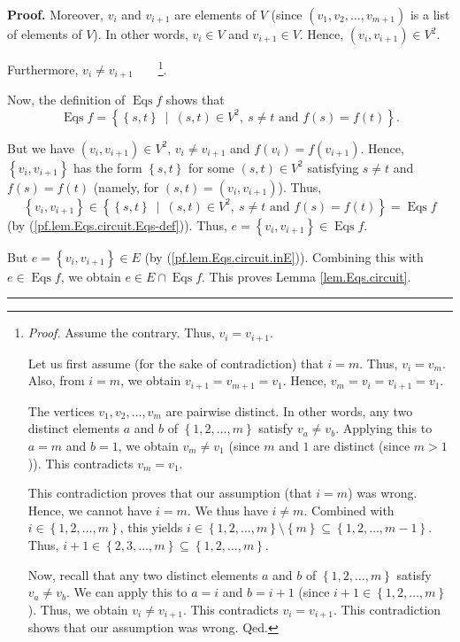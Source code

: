 \documentclass[numbers=enddot,12pt,final,onecolumn,notitlepage]{scrartcl}%
\theoremstyle{definition}
\newenvironment{proof}[1][Proof]{\noindent\textbf{#1.} }{\ \rule{0.5em}{0.5em}}
\newenvironment{verlong}{}{}
\begin{document}
\begin{verlong}
\begin{proof}
Moreover, $v_{i}$ and $v_{i+1}$ are elements of $V$ (since $\left(
v_{1},v_{2},\ldots,v_{m+1}\right)  $ is a list of elements of $V$). In other
words, $v_{i}\in V$ and $v_{i+1}\in V$. Hence, $\left(  v_{i},v_{i+1}\right)
\in V^{2}$.

Furthermore, $v_{i}\neq v_{i+1}$\ \ \ \ \footnote{\textit{Proof.} Assume the
contrary. Thus, $v_{i}=v_{i+1}$.
\par
Let us first assume (for the sake of contradiction) that $i=m$. Thus,
$v_{i}=v_{m}$. Also, from $i=m$, we obtain $v_{i+1}=v_{m+1}=v_{1}$. Hence,
$v_{m}=v_{i}=v_{i+1}=v_{1}$.
\par
The vertices $v_{1},v_{2},\ldots,v_{m}$ are pairwise distinct. In other words,
any two distinct elements $a$ and $b$ of $\left\{  1,2,\ldots,m\right\}  $
satisfy $v_{a}\neq v_{b}$. Applying this to $a=m$ and $b=1$, we obtain
$v_{m}\neq v_{1}$ (since $m$ and $1$ are distinct (since $m>1$)). This
contradicts $v_{m}=v_{1}$.
\par
This contradiction proves that our assumption (that $i=m$) was wrong. Hence,
we cannot have $i=m$. We thus have $i\neq m$. Combined with $i\in\left\{
1,2,\ldots,m\right\}  $, this yields $i\in\left\{  1,2,\ldots,m\right\}
\setminus\left\{  m\right\}  \subseteq\left\{  1,2,\ldots,m-1\right\}  $.
Thus, $i+1\in\left\{  2,3,\ldots,m\right\}  \subseteq\left\{  1,2,\ldots
,m\right\}  $.
\par
Now, recall that any two distinct elements $a$ and $b$ of $\left\{
1,2,\ldots,m\right\}  $ satisfy $v_{a}\neq v_{b}$. We can apply this to $a=i$
and $b=i+1$ (since $i+1\in\left\{  1,2,\ldots,m\right\}  $). Thus, we obtain
$v_{i}\neq v_{i+1}$. This contradicts $v_{i}=v_{i+1}$. This contradiction
shows that our assumption was wrong. Qed.}.

Now, the definition of $\operatorname*{Eqs}f$ shows that%
\begin{equation}
\operatorname*{Eqs}f=\left\{  \left\{  s,t\right\}  \ \mid\ \left(
s,t\right)  \in V^{2},\ s\neq t\text{ and }f\left(  s\right)  =f\left(
t\right)  \right\}  . \label{pf.lem.Eqs.circuit.Eqs-def}%
\end{equation}


But we have $\left(  v_{i},v_{i+1}\right)  \in V^{2}$, $v_{i}\neq v_{i+1}$ and
$f\left(  v_{i}\right)  =f\left(  v_{i+1}\right)  $. Hence, $\left\{
v_{i},v_{i+1}\right\}  $ has the form $\left\{  s,t\right\}  $ for some
$\left(  s,t\right)  \in V^{2}$ satisfying $s\neq t$ and $f\left(  s\right)
=f\left(  t\right)  $ (namely, for $\left(  s,t\right)  =\left(  v_{i}%
,v_{i+1}\right)  $). Thus,%
\[
\left\{  v_{i},v_{i+1}\right\}  \in\left\{  \left\{  s,t\right\}
\ \mid\ \left(  s,t\right)  \in V^{2},\ s\neq t\text{ and }f\left(  s\right)
=f\left(  t\right)  \right\}  =\operatorname*{Eqs}f
\]
(by (\ref{pf.lem.Eqs.circuit.Eqs-def})). Thus, $e=\left\{  v_{i}%
,v_{i+1}\right\}  \in\operatorname*{Eqs}f$.

But $e=\left\{  v_{i},v_{i+1}\right\}  \in E$ (by
(\ref{pf.lem.Eqs.circuit.inE})). Combining this with $e\in\operatorname*{Eqs}%
f$, we obtain $e\in E\cap\operatorname*{Eqs}f$. This proves Lemma
\ref{lem.Eqs.circuit}.
\end{proof}
\end{verlong}
\end{document}

